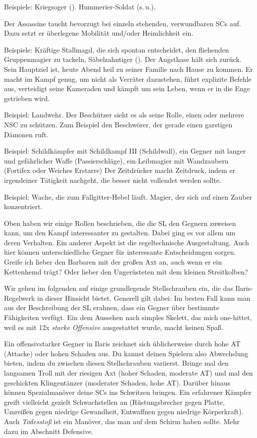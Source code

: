 Beispiele: Kriegsoger (). Hummerier-Soldat (s.\,u.). 


Der Assassine taucht bevorzugt bei einzeln stehenden, verwundbaren SCs auf.
Dazu setzt er überlegene Mobilität und/oder Heimlichkeit ein.

Beispiele: Kräftige Stallmagd, die sich spontan entscheidet, den fliehenden Gruppenmagier zu tackeln, Säbelzahntiger ().
Der Angsthase hält sich zurück. Sein Hauptziel ist, heute Abend heil zu seiner Familie nach Hause zu kommen.
Er macht im Kampf genug, um nicht als Verräter dazustehen, führt explizite Befehle aus, verteidigt seine Kameraden und kämpft um sein Leben, wenn er in die Enge getrieben wird.

Beispiel: Landwehr.
Der Beschützer sieht es als seine Rolle, einen oder mehrere NSC zu schützen.
Zum Beispiel den Beschwörer, der gerade einen garstigen Dämonen ruft.

Beispiel: Schildkämpfer mit Schildkampf III (Schildwall), ein Gegner mit langer und gefährlicher Waffe (Passierschläge), ein Leibmagier mit Wandzaubern (Fortifex oder Weiches Erstarre)
Der Zeitdrücker macht Zeitdruck, indem er irgendeiner Tätigkeit nachgeht, die besser nicht vollendet werden sollte.

Beispiel: Wache, die zum Fallgitter-Hebel läuft. Magier, der sich auf einen Zauber konzentriert.

Oben haben wir einige Rollen beschrieben, die die SL den Gegnern zuweisen kann, um den Kampf interessanter zu gestalten.
Dabei ging es vor allem um deren Verhalten. Ein anderer Aspekt ist die regeltechnische Ausgestaltung.
Auch hier können unterschiedliche Gegner für interessante Entscheidungen sorgen.
Greife ich lieber den Barbaren mit der großen Axt an, auch wenn er ein Kettenhemd trägt?
Oder lieber den Ungerüsteten mit dem kleinen Streitkolben?

Wir gehen im folgenden auf einige grundlegende Stellschrauben ein, die das Ilaris-Regelwerk in dieser Hinsicht bietet.
Generell gilt dabei: Im besten Fall kann man aus der Beschreibung der SL erahnen, dass ein Gegner über bestimmte Fähigkeiten verfügt.
Ein dem Aussehen nach simples Skelett, das mich one-hittet, weil es mit 12x \emph{starke Offensive} ausgestattet wurde, macht keinen Spaß.
\platz


Ein offensivstarker Gegner in Ilaris zeichnet sich üblicherweise durch hohe AT (Attacke) oder hohen Schaden aus.
Du kannst deinen Spielern also Abwechslung bieten, indem du zwischen diesen Stellschrauben variierst. 
Bringe mal den langsamen Troll mit der riesigen Axt (hoher Schaden, moderate AT) und mal den geschickten Klingentänzer (moderater Schaden, hohe AT).
Darüber hinaus können Spezialmanöver deine SCs ins Schwitzen bringen. Ein erfahrener Kämpfer greift vielleicht gezielt Schwachstellen an (Rüstungsbrecher gegen Platte, Umreißen gegen niedrige Gewandheit, Entwaffnen gegen niedrige Körperkraft).
Auch \textit{Todesstoß} ist ein Manöver, das man auf dem Schirm haben sollte. Mehr dazu im Abschnitt Defensive. 

